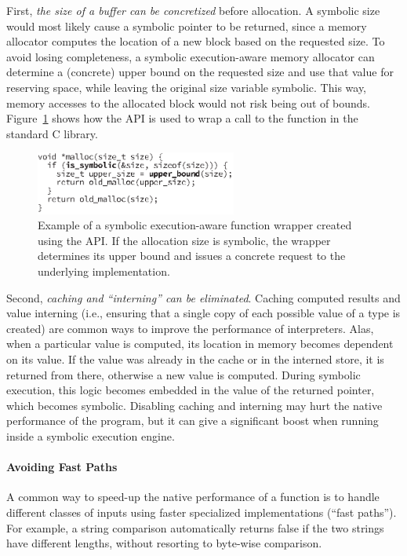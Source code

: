 First, \emph{the size of a buffer can be concretized} before allocation.  A symbolic size would most likely cause a symbolic pointer to be returned, since a memory allocator computes the location of a new block based on the requested size.  To avoid losing completeness, a symbolic execution-aware memory allocator can determine a (concrete) upper bound on the requested size and use that value for reserving space, while leaving the original size variable symbolic.  This way, memory accesses to the allocated block would not risk being out of bounds.  Figure~\ref{fig:sym-malloc} shows how the \chef API is used to wrap a call to the  function in the standard C library.

\begin{figure}
  \centering
  \includegraphics[width=2.6in]{figures/chef/mallocopt}
  \caption{Example of a symbolic execution-aware  function wrapper created using the \chef API.  If the allocation size is symbolic, the wrapper determines its upper bound and issues a concrete request to the underlying implementation.}
  \label{fig:sym-malloc}
\end{figure}

Second, \emph{caching and ``interning'' can be eliminated}.  Caching computed results and value interning (i.e., ensuring that a single copy of each possible value of a type is created) are common ways to improve the performance of interpreters.  Alas, when a particular value is computed, its location in memory becomes dependent on its value. If the value was already in the cache or in the interned store, it is returned from there, otherwise a new value is computed.  During symbolic execution, this logic becomes embedded in the value of the returned pointer, which becomes symbolic.  Disabling caching and interning may hurt the native performance of the program, but it can give a significant boost when running inside a symbolic execution engine.

\paragraph{Avoiding Fast Paths}

A common way to speed-up the native performance of a function is to handle different classes of inputs using faster specialized implementations (``fast paths'').  For example, a string comparison automatically returns false if the two strings have different lengths, without resorting to byte-wise comparison.


